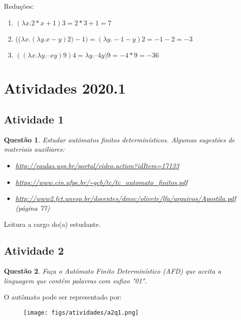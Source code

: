 \documentclass{article}
\newtheorem{problem}{Questão}
\begin{document}
    \begin{solution} Reduções:
        \begin{enumerate}[label=(\alph*)]
            \item $(\lambda x. 2*x + 1) 3 = 2*3 + 1 = 7$
            \item (($\lambda x.(\lambda y.x-y) 2 ) -1) = (\lambda y.-1-y) 2  = -1-2 = -3$
            \item $((\lambda x. \lambda y. – x y) 9 ) 4 =  \lambda y. – 4 y) 9 = -4*9 = -36 $
        \end{enumerate}
    \end{solution}

\section{Atividades 2020.1}
\subsection{Atividade 1}
\begin{problem} Estudar autômatos finitos determinísticos.
Algumas sugestões de materiais auxiliares:
\begin{itemize}
    \item \url{http://eaulas.usp.br/portal/video.action?idItem=17133}
    \item \url{https://www.cin.ufpe.br/~gcb/tc/tc_automato_finitos.pdf}
    \item \url{http://www2.fct.unesp.br/docentes/dmec/olivete/lfa/arquivos/Apostila.pdf}  (página 77)
\end{itemize}

\end{problem}
\begin{solution} Leitura a cargo do(a) estudante.
\end{solution}

\subsection{Atividade 2}
\begin{problem} Faça o Autômato Finito Determinístico (AFD) que aceita a linguagem que contém palavras com sufixo "01".
\end{problem}

\begin{solution}
    O autômato pode ser representado por:

\begin{figure}[H]
        \centering
        \texttt{[image: figs/atividades/a2q1.png]}
\end{figure}
\end{solution}
\end{document}
